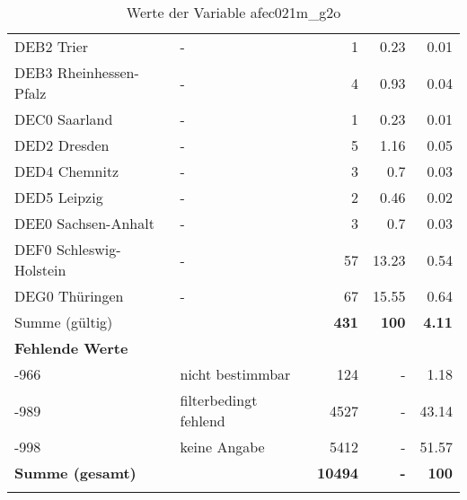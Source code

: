 \begin{longtable}{Xlrrr}
        \multicolumn{1}{X}{DEB2 Trier} & - & \num{1} & \num[round-mode=places,round-precision=2]{0.23} & \num[round-mode=places,round-precision=2]{0.01} \\
        \multicolumn{1}{X}{DEB3 Rheinhessen-Pfalz} & - & \num{4} & \num[round-mode=places,round-precision=2]{0.93} & \num[round-mode=places,round-precision=2]{0.04} \\
        \multicolumn{1}{X}{DEC0 Saarland} & - & \num{1} & \num[round-mode=places,round-precision=2]{0.23} & \num[round-mode=places,round-precision=2]{0.01} \\
        \multicolumn{1}{X}{DED2 Dresden} & - & \num{5} & \num[round-mode=places,round-precision=2]{1.16} & \num[round-mode=places,round-precision=2]{0.05} \\
        \multicolumn{1}{X}{DED4 Chemnitz} & - & \num{3} & \num[round-mode=places,round-precision=2]{0.7} & \num[round-mode=places,round-precision=2]{0.03} \\
        \multicolumn{1}{X}{DED5 Leipzig} & - & \num{2} & \num[round-mode=places,round-precision=2]{0.46} & \num[round-mode=places,round-precision=2]{0.02} \\
        \multicolumn{1}{X}{DEE0 Sachsen-Anhalt} & - & \num{3} & \num[round-mode=places,round-precision=2]{0.7} & \num[round-mode=places,round-precision=2]{0.03} \\
        \multicolumn{1}{X}{DEF0 Schleswig-Holstein} & - & \num{57} & \num[round-mode=places,round-precision=2]{13.23} & \num[round-mode=places,round-precision=2]{0.54} \\
        \multicolumn{1}{X}{DEG0 Thüringen} & - & \num{67} & \num[round-mode=places,round-precision=2]{15.55} & \num[round-mode=places,round-precision=2]{0.64} \\
     \midrule
      \multicolumn{2}{l}{Summe (gültig)} & \textbf{\num{431}} &
      \textbf{\num{100}} &
         \textbf{\num[round-mode=places,round-precision=2]{4.11}} \\
     \multicolumn{5}{l}{\textbf{Fehlende Werte}}\\
       -966 & nicht bestimmbar & \num{124} & - & \num[round-mode=places,round-precision=2]{1.18} \\

       -989 & filterbedingt fehlend & \num{4527} & - & \num[round-mode=places,round-precision=2]{43.14} \\

       -998 & keine Angabe & \num{5412} & - & \num[round-mode=places,round-precision=2]{51.57} \\

     \midrule
     \multicolumn{2}{l}{\textbf{Summe (gesamt)}} & \textbf{\num{10494}} & \textbf{-} & \textbf{\num{100}} \\
     \bottomrule
     \caption{Werte der Variable afec021m\_g2o}
     \end{longtable}
     
